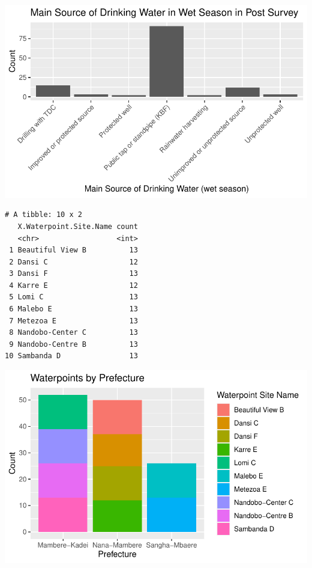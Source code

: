\documentclass[
  letterpaper,
  DIV=11,
  numbers=noendperiod]{scrartcl}
\begin{document}
\includegraphics{report_files/figure-pdf/unnamed-chunk-34-1.pdf}

\begin{verbatim}
# A tibble: 10 x 2
   X.Waterpoint.Site.Name count
   <chr>                  <int>
 1 Beautiful View B          13
 2 Dansi C                   12
 3 Dansi F                   13
 4 Karre E                   12
 5 Lomi C                    13
 6 Malebo E                  13
 7 Metezoa E                 13
 8 Nandobo-Center C          13
 9 Nandobo-Centre B          13
10 Sambanda D                13
\end{verbatim}

\includegraphics{report_files/figure-pdf/unnamed-chunk-36-1.pdf}
\end{document}
